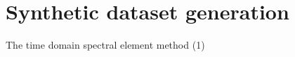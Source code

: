 \documentclass[10pt,aspectratio=169,dvipsnames]{beamer} %
\begin{document}
%	
\section{Synthetic dataset generation}
\setcounter{subfigure}{0}
\begin{frame}{The time domain spectral element method (1)}
	\begin{columns}[T]
		\begin{column}{0.65\textwidth}
			\begin{figure}
			\end{figure}
		\end{column}
		\begin{column}{0.3\textwidth}	
			\begin{figure}
			\end{figure}
		\end{column}
	\end{columns}	
\end{frame}
\end{document}
